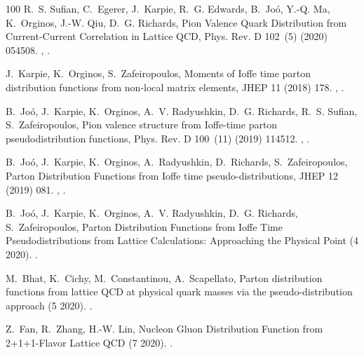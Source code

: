 \begin{thebibliography}{100}
R.~S. Sufian, C.~Egerer, J.~Karpie, R.~G. Edwards, B.~Jo\'o, Y.-Q. Ma,
  K.~Orginos, J.-W. Qiu, D.~G. Richards, {Pion Valence Quark Distribution from
  Current-Current Correlation in Lattice QCD}, Phys. Rev. D 102~(5) (2020)
  054508.
\newblock \href {http://arxiv.org/abs/2001.04960} {},
  \href {https://doi.org/10.1103/PhysRevD.102.054508}
  {}.

J.~Karpie, K.~Orginos, S.~Zafeiropoulos, {Moments of Ioffe time parton
  distribution functions from non-local matrix elements}, JHEP 11 (2018) 178.
\newblock \href {http://arxiv.org/abs/1807.10933} {},
  \href {https://doi.org/10.1007/JHEP11(2018)178}
  {}.

B.~Jo\'o, J.~Karpie, K.~Orginos, A.~V. Radyushkin, D.~G. Richards, R.~S.
  Sufian, S.~Zafeiropoulos, {Pion valence structure from Ioffe-time parton
  pseudodistribution functions}, Phys. Rev. D 100~(11) (2019) 114512.
\newblock \href {http://arxiv.org/abs/1909.08517} {},
  \href {https://doi.org/10.1103/PhysRevD.100.114512}
  {}.

B.~Jo\'o, J.~Karpie, K.~Orginos, A.~Radyushkin, D.~Richards, S.~Zafeiropoulos,
  {Parton Distribution Functions from Ioffe time pseudo-distributions}, JHEP 12
  (2019) 081.
\newblock \href {http://arxiv.org/abs/1908.09771} {},
  \href {https://doi.org/10.1007/JHEP12(2019)081}
  {}.

B.~Jo\'o, J.~Karpie, K.~Orginos, A.~V. Radyushkin, D.~G. Richards,
  S.~Zafeiropoulos, {Parton Distribution Functions from Ioffe Time
  Pseudodistributions from Lattice Calculations: Approaching the Physical
  Point} (4 2020).
\newblock \href {http://arxiv.org/abs/2004.01687} {}.

M.~Bhat, K.~Cichy, M.~Constantinou, A.~Scapellato, {Parton distribution
  functions from lattice QCD at physical quark masses via the
  pseudo-distribution approach} (5 2020).
\newblock \href {http://arxiv.org/abs/2005.02102} {}.

Z.~Fan, R.~Zhang, H.-W. Lin, {Nucleon Gluon Distribution Function from
  2+1+1-Flavor Lattice QCD} (7 2020).
\newblock \href {http://arxiv.org/abs/2007.16113} {}.

\end{thebibliography}
